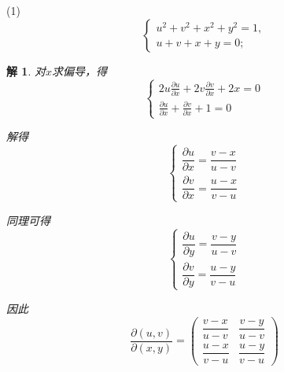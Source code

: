 \documentclass[a4paper,12pt]{article}
\newtheorem*{sol}{解}
\begin{document}
(1)
$$
    \begin{cases}
        u^2 + v^2 + x^2 + y^2 = 1, \\
        u + v + x + y = 0;
    \end{cases}
$$
\begin{sol}
    对$x$求偏导，得
    $$\begin{cases}
            2u\frac{\partial u}{\partial x} + 2v\frac{\partial v}{\partial x} + 2x = 0 \\
            \frac{\partial u}{\partial x} + \frac{\partial v}{\partial x} + 1 = 0
        \end{cases}$$

    解得
    $$\begin{cases}
            \dfrac{\partial u}{\partial x} = \dfrac{v - x}{u - v} \\[10pt]
            \dfrac{\partial v}{\partial x} = \dfrac{u - x}{v - u}
        \end{cases}$$

    同理可得
    $$\begin{cases}
            \dfrac{\partial u}{\partial y} = \dfrac{v - y}{u - v} \\[10pt]
            \dfrac{\partial v}{\partial y} = \dfrac{u - y}{v - u}
        \end{cases}$$

    因此
    $$\frac{\partial(u,v)}{\partial(x,y)} = \begin{pmatrix}
            \dfrac{v - x}{u - v} & \dfrac{v - y}{u - v} \\[10pt]
            \dfrac{u - x}{v - u} & \dfrac{u - y}{v - u}
        \end{pmatrix}$$
\end{sol}
\end{document}
